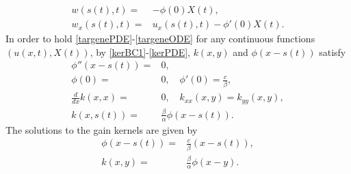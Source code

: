 \documentclass[journal]{IEEEtran}
\begin{document}
\begin{align}\label{kerBC1}
w(s(t),t)=&-\phi(0) X(t), \\
\label{kerBC2}w_x(s(t),t)=&u_x(s(t),t)-\phi'(0) X(t). 
\end{align}
In order to hold \eqref{targenePDE}-\eqref{targeneODE} for any continuous functions $(u(x,t), X(t))$, by \eqref{kerBC1}-\eqref{kerPDE}, $k(x,y)$ and $\phi(x-s(t))$ satisfy 
\begin{align}
\phi''(x-s(t))=&0, \\
\phi(0)=&0, \quad \phi'(0) = \frac{c}{\beta}, \\
\frac{d}{dx}k(x,x) = &0, \quad k_{xx}(x,y)=k_{yy}(x,y), \\
k(x,s(t)) = &\frac{\beta}{\alpha}\phi(x-s(t)).
\end{align}
The solutions to the gain kernels are given by
\begin{align}
\phi(x-s(t))=&\frac{c}{\beta}(x-s(t)),\\
k(x,y)=&\frac{\beta}{\alpha} \phi(x-y).
\end{align}
\end{document}
